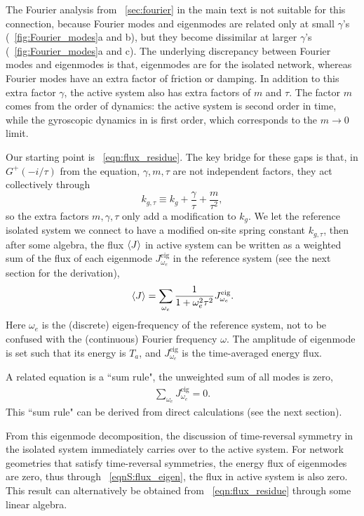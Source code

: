 \documentclass[
 amsmath,amssymb,
 aps,
 pre,
 longbibliography,
 10pt, onecolumn,
 notitlepage
]{revtex4-1}
\begin{document}
The Fourier analysis from \secname~\ref{sec:fourier} in the main text is not suitable for this connection, because Fourier modes and eigenmodes are related only at small $\gamma$'s (\figurename~\ref{fig:Fourier_modes}a and b), but they become dissimilar at larger $\gamma$'s (\figurename~\ref{fig:Fourier_modes}a and c).
The underlying discrepancy between Fourier modes and eigenmodes is that, eigenmodes are for the isolated network, whereas Fourier modes have an extra factor of friction or damping.
In addition to this extra factor $\gamma$,
the active system also has extra factors of $m$ and $\tau$. The factor $m$ comes from the order of dynamics: the active system is second order in time, while the gyroscopic dynamics in \cite{Nash2015TopologicalMechanics} is first order, which corresponds to the $m\rightarrow 0$ limit.

Our starting point is \eqnname~\eqref{eqn:flux_residue}. The key bridge for these gaps is that, in $G^+(-i/\tau)$ from the equation, $\gamma,m,\tau$ are not independent factors, they act collectively through 
\begin{equation}
    k_{g,\tau} \equiv k_g+\frac{\gamma}{\tau}+\frac{m}{\tau^2},
\end{equation}
so the extra factors $m,\gamma, \tau$ only add a modification to $k_g$.
We let the reference isolated system we connect to have a modified on-site spring constant $k_{g,\tau}$, then after some algebra, the flux $\expval{J}$ in active system can be written as a weighted sum of the flux of each eigenmode $J^{\text{eig}}_{\omega_e}$ in the reference system (see the next section for the derivation),
\begin{equation} \label{eqnS:flux_eigen}
    \expval{J} = \sum_{\omega_e} \frac{1}{1+\omega_e^2\tau^2} J^{\text{eig}}_{\omega_e}.
\end{equation}
Here $\omega_e$ is the (discrete) eigen-frequency of the reference system, not to be confused with the (continuous) Fourier frequency $\omega$. The amplitude of eigenmode is set such that its energy is $T_a$, and $J^{\text{eig}}_{\omega_e}$ is the time-averaged energy flux.

A related equation is a ``sum rule", the unweighted sum of all modes is zero, 
\begin{align}
    \sum_{\omega_e} J^{\text{eig}}_{\omega_e} = 0. \label{eqnS:eigen_sum_rule}
\end{align}
This ``sum rule" can be derived from direct calculations (see the next section).

From this eigenmode decomposition, the discussion of time-reversal symmetry in the isolated system \cite{Nash2015TopologicalMechanics} immediately carries over to the active system. For network geometries that satisfy time-reversal symmetries, the energy flux of eigenmodes are zero, thus through \eqnname~\eqref{eqnS:flux_eigen}, the flux in active system is also zero. This result can alternatively be obtained from \eqnname~\eqref{eqn:flux_residue} through some linear algebra.
\end{document}
